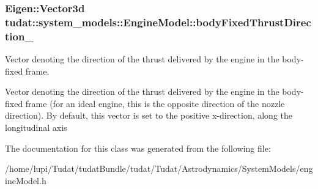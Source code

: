 \subsubsection[{\texorpdfstring{body\+Fixed\+Thrust\+Direction\+\_\+}{bodyFixedThrustDirection_}}]{\setlength{\rightskip}{0pt plus 5cm}Eigen\+::\+Vector3d tudat\+::system\+\_\+models\+::\+Engine\+Model\+::body\+Fixed\+Thrust\+Direction\+\_\+\hspace{0.3cm}{\ttfamily [protected]}}\hypertarget{classtudat_1_1system__models_1_1EngineModel_af77579b23f705ecc3ac02532ef1ab147}{}\label{classtudat_1_1system__models_1_1EngineModel_af77579b23f705ecc3ac02532ef1ab147}


Vector denoting the direction of the thrust delivered by the engine in the body-\/fixed frame. 

Vector denoting the direction of the thrust delivered by the engine in the body-\/fixed frame (for an ideal engine, this is the opposite direction of the nozzle direction). By default, this vector is set to the positive x-\/direction, along the longitudinal axis 

The documentation for this class was generated from the following file\+:\begin{DoxyCompactItemize}
\item 
/home/lupi/\+Tudat/tudat\+Bundle/tudat/\+Tudat/\+Astrodynamics/\+System\+Models/engine\+Model.\+h\end{DoxyCompactItemize}
